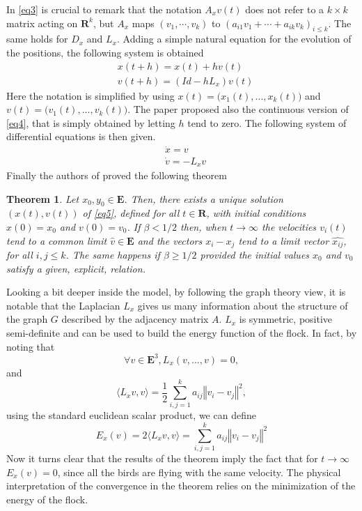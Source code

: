 \documentclass{article} %
\newcounter{math}
\newtheorem{theorem}{Theorem}
\begin{document}
In \eqref{eq3} is crucial to remark that the notation $A_xv(t)$ does not refer to a 
$k \times k$ matrix acting on $\mathbf{R}^k$, but $A_x$ maps $(v_1, \dotsb ,v_k)$ 
to $(a_{i1}v_1+ \dotsb +a_{ik}v_k)_{i\leq k}$. The same holds for $D_x$ and $L_x$.
Adding a simple natural equation for the evolution of the positions, the following
system is obtained
\begin{align}
\label{eq4}
    &x(t+h) = x(t) + hv(t)\\
    &v(t+h) = (Id -hL_x)v(t)\nonumber
\end{align}
Here the notation is simplified by using $x(t)=\big(x_1(t),...,x_k(t)\big)$ and
$v(t)=\big(v_1(t),...,v_k(t)\big)$.
The paper \cite{CuckerSmale} proposed also the continuous version of \eqref{eq4}, that
is simply obtained by letting $h$ tend to zero. The following system of differential 
equations is then given.
\begin{align}
\label{eq5}
    &\dot{x} = v\\
    &\dot{v} = -L_xv\nonumber
\end{align}
Finally the authors of \cite{CuckerSmale} proved the following theorem
\begin{theorem}
    Let $x_0,y_0\in \mathbf{E}$. Then, there exists a unique solution $(x(t),v(t))$ of 
    \eqref{eq5}, defined for all $t \in \mathbf{R}$, with initial conditions $x(0)=x_0$ and
    $v(0)=v_0$. If $\beta<1/2$ then, when $t\rightarrow\infty$ the velocities $v_i(t)$ tend
    to a common limit $\widehat{v}\in\mathbf{E}$ and the vectors $x_i-x_j$ tend to a limit 
    vector $\widehat{x_{ij}}$, for all $i,j\leq k$. The same happens if $\beta\geq1/2$ provided
    the initial values $x_0$ and $v_0$ satisfy a given, explicit, relation.
\end{theorem}
Looking a bit deeper inside the model, by following the graph theory view, it is notable that
the Laplacian $L_x$ gives us many information about the structure of the graph $G$ described
by the adjacency matrix $A$. $L_x$ is symmetric, positive semi-definite and can be used to 
build the energy function of the flock. In fact, by noting that
\begin{equation}
	\label{eq6}
	\forall v \in \mathbf{E}^3, L_x(v,...,v)=0,
\end{equation} and
\begin{equation}
	\label{eq7}
	\langle L_xv,v\rangle=\frac{1}{2}\sum_{i,j=1}^ka_{ij}\left\Vert v_i - v_j\right\Vert^2,
\end{equation}
using the standard euclidean scalar product, we can define 
\begin{equation}
	\label{eq8}
	E_x(v)=2\langle L_xv,v\rangle=\sum_{i,j=1}^ka_{ij}\left\Vert v_i - v_j\right\Vert^2
\end{equation}
Now it turns clear that the results of the theorem imply the fact that for $t\rightarrow\infty$ $E_x(v)=0$,
since all the birds are flying with the same velocity. The physical interpretation of the 
convergence in the theorem relies on the minimization of the energy of the flock.
\end{document}
